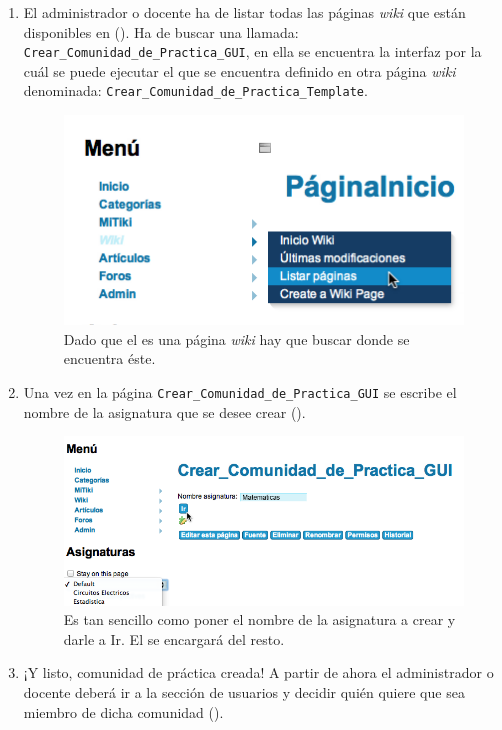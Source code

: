 \begin{enumerate}
\item El administrador o docente ha de listar todas las páginas \textit{wiki} que están disponibles en \tiki{} (). Ha de buscar una llamada: \texttt{Crear\_Comunidad\_de\_Practica\_GUI}, en ella se encuentra la interfaz por la cuál se puede ejecutar el \profile{} que se encuentra definido en otra página \textit{wiki} denominada: \texttt{Crear\_Comunidad\_de\_Practica\_Template}.

\begin{figure}
\centering
\includegraphics{../graphics/fig_listar_paginas_wiki_profiles.png}
\caption{Dado que el \profile{} es una página \textit{wiki} hay que buscar donde se encuentra éste.}\label{fig:listar_paginas_wiki_profiles}
\end{figure}

\item Una vez en la página \texttt{Crear\_Comunidad\_de\_Practica\_GUI} se escribe el nombre de la asignatura que se desee crear ().

\begin{figure}
\centering
\includegraphics[width=\linewidth]{../graphics/fig_crear_asignatura_matematicas_profile.png}
\caption{Es tan sencillo como poner el nombre de la asignatura a crear y darle a Ir. El \profile{} se encargará del resto.}\label{fig:crear_asignatura_matematicas_profile}
\end{figure}

\item ¡Y listo, comunidad de práctica creada! A partir de ahora el administrador o docente deberá ir a la sección de usuarios y decidir quién quiere que sea miembro de dicha comunidad ().
\end{enumerate}

